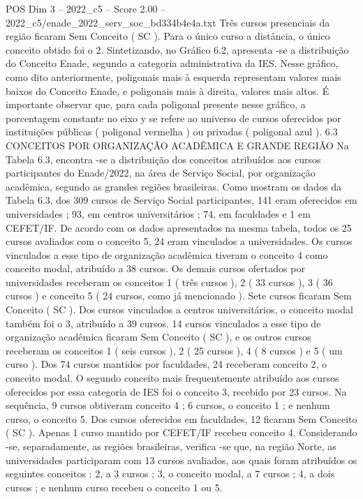 \begin{textsample}{POS Dim 3 – 2022\_c5 – Score 2.00 – 2022\_c5/enade\_2022\_serv\_soc\_bd334b4e4a.txt}
Três cursos presenciais da região ficaram Sem Conceito ( SC ).
Para o único curso a distância, o único conceito obtido foi o 2.
Sintetizando, no Gráfico 6.2, apresenta -se a distribuição do Conceito Enade, segundo a categoria administrativa da IES.
Nesse gráfico, como dito anteriormente, poligonais mais à esquerda representam valores mais baixos do Conceito Enade, e poligonais mais à direita, valores mais altos.
É importante observar que, para cada poligonal presente nesse gráfico, a porcentagem constante no eixo y se refere ao universo de cursos oferecidos por instituições públicas ( poligonal vermelha ) ou privadas ( poligonal azul ). 6.3 CONCEITOS POR ORGANIZAÇÃO ACADÊMICA E GRANDE REGIÃO Na Tabela 6.3, encontra -se a distribuição dos conceitos atribuídos aos cursos participantes do Enade/2022, na área de Serviço Social, por organização acadêmica, segundo as grandes regiões brasileiras.
Como mostram os dados da Tabela 6.3, dos 309 cursos de Serviço Social participantes, 141 eram oferecidos em universidades ; 93, em centros universitários ; 74, em faculdades e 1 em CEFET/IF.
De acordo com os dados apresentados na mesma tabela, todos os 25 cursos avaliados com o conceito 5, 24 eram vinculados a universidades.
Os cursos vinculados a esse tipo de organização acadêmica tiveram o conceito 4 como conceito modal, atribuído a 38 cursos.
Os demais cursos ofertados por universidades receberam os conceitos 1 ( três cursos ), 2 ( 33 cursos ), 3 ( 36 cursos ) e conceito 5 ( 24 cursos, como já mencionado ).
Sete cursos ficaram Sem Conceito ( SC ).
Dos cursos vinculados a centros universitários, o conceito modal também foi o 3, atribuído a 39 cursos. 14 cursos vinculados a esse tipo de organização acadêmica ficaram Sem Conceito ( SC ), e os outros cursos receberam os conceitos 1 ( seis cursos ), 2 ( 25 cursos ), 4 ( 8 cursos ) e 5 ( um curso ).
Dos 74 cursos mantidos por faculdades, 24 receberam conceito 2, o conceito modal.
O segundo conceito mais frequentemente atribuído aos cursos oferecidos por essa categoria de IES foi o conceito 3, recebido por 23 cursos.
Na sequência, 9 cursos obtiveram conceito 4 ; 6 cursos, o conceito 1 ; e nenhum curso, o conceito 5.
Dos cursos oferecidos em faculdades, 12 ficaram Sem Conceito ( SC ).
Apenas 1 curso mantido por CEFET/IF recebeu conceito 4.
Considerando -se, separadamente, as regiões brasileiras, verifica -se que, na região Norte, as universidades participaram com 13 cursos avaliados, aos quais foram atribuídos os seguintes conceitos : 2, a 3 cursos ; 3, o conceito modal, a 7 cursos ; 4, a dois cursos ; e nenhum curso recebeu o conceito 1 ou 5.

\end{textsample}
